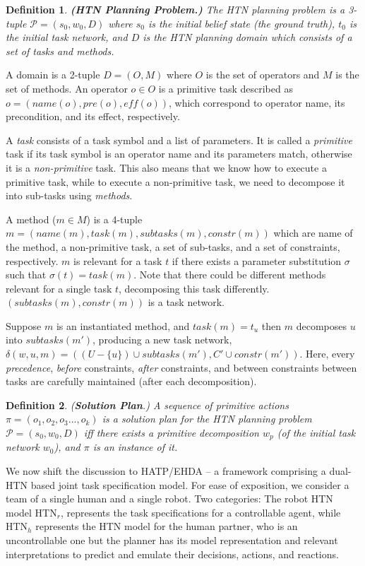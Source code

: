 \documentclass[letterpaper]{article} %
\newtheorem{definition}{Definition}
\begin{document}
\begin{definition}
\textbf{(HTN Planning Problem.)} 
The HTN planning
problem is a 3-tuple $\mathcal{P} = (s_0, w_0, D)$ where $s_0$ is the initial belief state (the ground truth), $t_0$ is the initial task network, and $D$ is the HTN planning domain which consists of a set of tasks and methods.
\end{definition}
A domain is a 2-tuple $D=(O, M)$ where $O$ is the set of operators and $M$ is the set of methods. An operator $o \in O$ is a primitive task described as $o=(name(o), pre(o), \textit{eff}(o))$, which correspond to operator name, its precondition, and its effect, respectively. 

A \textit{task} consists of a task symbol and a list of parameters. It is called a \textit{primitive} task if its task symbol is an operator name and its parameters match, otherwise it is a \textit{non-primitive} task. This also means that we know how to execute a primitive task, while to execute a non-primitive task, we need to decompose it into sub-tasks using \textit{methods}. 

A method ($m \in M$) is a 4-tuple $m=(name(m),task(m),subtasks(m),constr(m))$ which are name of the method, a non-primitive task, a set of sub-tasks, and a set of constraints, respectively. $m$ is relevant for a task $t$ if there exists a parameter substitution $\sigma$ such that $\sigma(t) = task(m)$. Note that there could be different methods relevant for a single task $t$, decomposing this task differently. $(subtasks(m),constr(m))$ is a task network.      

Suppose $m$ is an instantiated method, and $task(m)=t_u$ then $m$ decomposes $u$ into $subtasks(m')$, producing a new task network, $\delta(w,u,m)=((U-\{u\})\cup subtasks(m'),C'\cup constr(m'))$.
Here, every \textit{precedence}, \textit{before} constraints, \textit{after} constraints, and between constraints between tasks are carefully maintained (after each decomposition).

\begin{definition} 
(\textbf{Solution Plan}.) 
{A sequence of primitive actions $\pi=(o_1,o_2,o_3...,o_k)$ is a solution plan for the HTN planning problem $\mathcal{P}=(s_0,w_0,D)$ iff there exists a primitive decomposition $w_p$ (of the initial task network $w_0$), and $\pi$ is an instance of it. 
}  
\end{definition}

We now shift the discussion to HATP/EHDA -- a framework comprising a dual-HTN based joint task specification model.   
For ease of exposition, we consider a team of a single human and a single robot. Two categories: The robot HTN model $\mathrm{HTN}_{r}$, represents the task specifications for a controllable agent, while $\mathrm{HTN}_{h}$ represents the HTN model for the human partner, who is an uncontrollable one but the planner has its model
representation and relevant interpretations to predict and emulate their decisions, actions, and reactions. 
\end{document}
